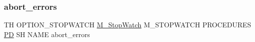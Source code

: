 \subsubsection{\texorpdfstring{abort\+\_\+errors}{abort\_errors}}
{\footnotesize\ttfamily TH O\+P\+T\+I\+O\+N\+\_\+\+S\+T\+O\+P\+W\+A\+T\+CH \hyperlink{option__stopwatch_83_8txt_aa2011fc45a5e502e87ee50996a8a9305}{M\+\_\+\+Stop\+Watch} M\+\_\+\+S\+T\+O\+P\+W\+A\+T\+CH P\+R\+O\+C\+E\+D\+U\+R\+ES \hyperlink{what__overview_81_8txt_a85f26da5a4481fbdb0d9c79f2b94de3e}{PD} SH N\+A\+ME abort\+\_\+errors}

\mbox{\label{option__stopwatch_83_8txt_a6082c9e66fc297fc25fb963a8e2d11cf}} 
